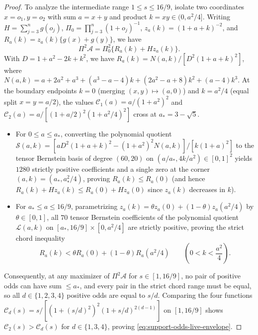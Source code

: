 \documentclass[11pt]{article}
\numberwithin{equation}{section}
\theoremstyle{definition}
\theoremstyle{remark}
\begin{document}
\begin{proof}
To analyze the intermediate range $1\le s\le16/9$, isolate two coordinates
$x=o_1,y=o_2$ with sum $a=x+y$ and product $k=xy\in(0,a^2/4]$. Writing
$H=\sum_{j=3}^ng(o_j)$, $\Pi_0=\prod_{j=3}^n(1+o_j)^{-1}$,
$z_a(k)=(1+a+k)^{-2}$, and $R_a(k)=z_a(k)\{g(x)+g(y)\}$, we have
\begin{equation}
 \Pi^2\mathcal A=\Pi_0^2\{R_a(k)+Hz_a(k)\}.
\label{eq:support-odds-affine-environment}
\end{equation}
With $D=1+a^2-2k+k^2$, we have $R_a(k)=N(a,k)/[D^2(1+a+k)^2]$, where
$N(a,k)=a+2a^2+a^3+(a^3-a-4)k+(2a^2-a+8)k^2+(a-4)k^3$. At the boundary
endpoints $k=0$ (merging $(x,y)\mapsto(a,0)$) and $k=a^2/4$ (equal split
$x=y=a/2$), the values $\mathcal C_1(a)=a/(1+a^2)^2$ and
$\mathcal C_2(a)=a/[(1+a/2)^2(1+a^2/4)^2]$ cross at $a_*=3-\sqrt5$.
\begin{itemize}[leftmargin=2em]
\item For $0\le a\le a_*$, converting the polynomial quotient
$\mathcal S(a,k)=[aD^2(1+a+k)^2-(1+a^2)^2N(a,k)]/[k(1+a)^2]$ to the tensor
Bernstein basis of degree $(60,20)$ on $(a/a_*,4k/a^2)\in[0,1]^2$ yields
$1280$ strictly positive coefficients and a single zero at the corner
$(a,k)=(a_*,a_*^2/4)$, proving $R_a(k)\le R_a(0)$ (and hence
$R_a(k)+Hz_a(k)\le R_a(0)+Hz_a(0)$ since $z_a(k)$ decreases in $k$).
\item For $a_*\le a\le16/9$, parametrizing $z_a(k)=\theta z_a(0)+(1-\theta)z_a(a^2/4)$
by $\theta\in[0,1]$, all $70$ tensor Bernstein coefficients of the polynomial
quotient $\mathcal L(a,k)$ on $[a_*,16/9]\times[0,a^2/4]$ are strictly
positive, proving the strict chord inequality
\begin{equation}
 R_a(k)<\theta R_a(0)+(1-\theta)R_a(a^2/4)
 \qquad\left(0<k<\frac{a^2}{4}\right).
\label{eq:support-odds-pair-chord}
\end{equation}
\end{itemize}
Consequently, at any maximizer of $\Pi^2\mathcal A$ for $s\in[1,16/9]$, no
pair of positive odds can have sum $\le a_*$, and every pair in the strict
chord range must be equal, so all $d\in\{1,2,3,4\}$ positive odds are equal to
$s/d$. Comparing the four functions $\mathcal C_d(s)=s/[(1+(s/d)^2)^2(1+s/d)^{2(d-1)}]$
on $[1,16/9]$ shows $\mathcal C_2(s)>\mathcal C_d(s)$ for $d\in\{1,3,4\}$,
proving \eqref{eq:support-odds-live-envelope}.


\end{proof}
\end{document}

